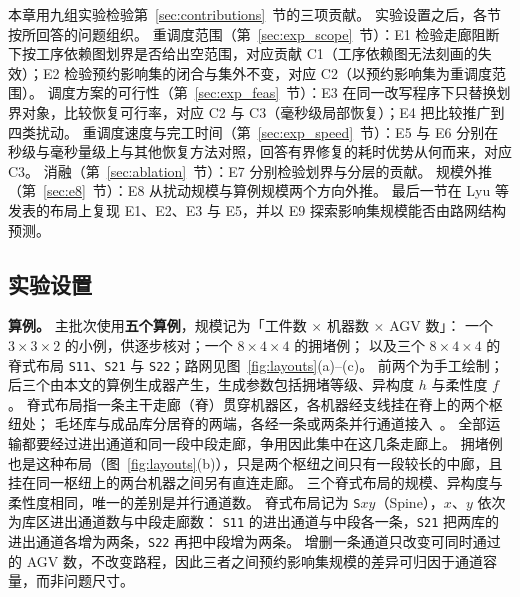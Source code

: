 \documentclass[manuscript,screen,review]{acmart}
\begin{document}
本章用九组实验检验第~\ref{sec:contributions}~节的三项贡献。
实验设置之后，各节按所回答的问题组织。
重调度范围（第~\ref{sec:exp_scope}~节）：E1 检验走廊阻断下按工序依赖图划界是否给出空范围，对应贡献 C1（工序依赖图无法刻画的失效）；E2 检验预约影响集的闭合与集外不变，对应 C2（以预约影响集为重调度范围）。
调度方案的可行性（第~\ref{sec:exp_feas}~节）：E3 在同一改写程序下只替换划界对象，比较恢复可行率，对应 C2 与 C3（毫秒级局部恢复）；E4 把比较推广到四类扰动。
重调度速度与完工时间（第~\ref{sec:exp_speed}~节）：E5 与 E6 分别在秒级与毫秒量级上与其他恢复方法对照，回答有界修复的耗时优势从何而来，对应 C3。
消融（第~\ref{sec:ablation}~节）：E7 分别检验划界与分层的贡献。
规模外推（第~\ref{sec:e8}~节）：E8 从扰动规模与算例规模两个方向外推。
最后一节在 Lyu 等发表的布局上复现 E1、E2、E3 与 E5，并以 E9 探索影响集规模能否由路网结构预测。

\subsection{实验设置}
\label{sec:protocol}

\textbf{算例。}
主批次使用\textbf{五个算例}，规模记为「工件数 \(\times\) 机器数 \(\times\) AGV 数」：
一个 \(3\times3\times2\) 的小例，供逐步核对；一个 \(8\times4\times4\) 的拥堵例；
以及三个 \(8\times4\times4\) 的脊式布局 \texttt{S11}、\texttt{S21} 与 \texttt{S22}；路网见图~\ref{fig:layouts}(a)--(c)。
前两个为手工绘制；后三个由本文的算例生成器产生，生成参数包括拥堵等级、异构度 \(h\) 与柔性度 \(f\)。
脊式布局指一条主干走廊（脊）贯穿机器区，各机器经支线挂在脊上的两个枢纽处；
毛坯库与成品库分居脊的两端，各经一条或两条并行通道接入~\cite{suh2022spine}。
全部运输都要经过进出通道和同一段中段走廊，争用因此集中在这几条走廊上。
拥堵例也是这种布局（图~\ref{fig:layouts}(b)），只是两个枢纽之间只有一段较长的中廊，且挂在同一枢纽上的两台机器之间另有直连走廊。
三个脊式布局的规模、异构度与柔性度相同，唯一的差别是并行通道数。
脊式布局记为 \texttt{S}\(xy\)（Spine），\(x\)、\(y\) 依次为库区进出通道数与中段走廊数：
\texttt{S11} 的进出通道与中段各一条，\texttt{S21} 把两库的进出通道各增为两条，\texttt{S22} 再把中段增为两条。
增删一条通道只改变可同时通过的 AGV 数，不改变路程，因此三者之间预约影响集规模的差异可归因于通道容量，而非问题尺寸。
\end{document}
